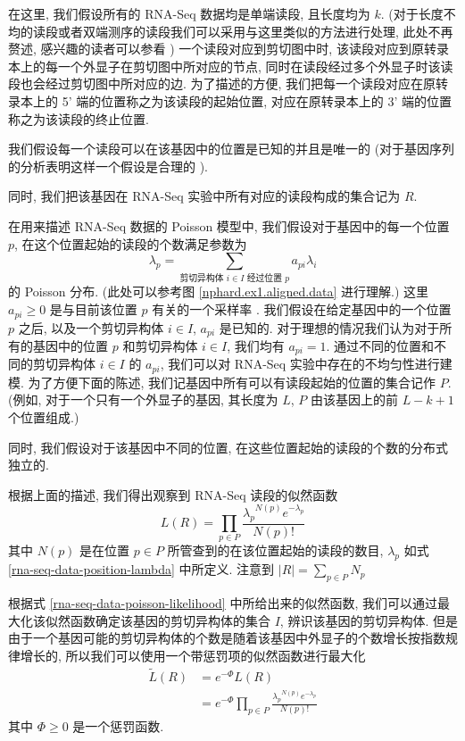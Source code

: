 在这里, 我们假设所有的 RNA-Seq 数据均是单端读段, 且长度均为 $k$. 
(对于长度不均的读段或者双端测序的读段我们可以采用与这里类似的方法进行处理, 
此处不再赘述, 感兴趣的读者可以参看 ) 
一个读段对应到剪切图中时, 该读段对应到原转录本上的每一个外显子在剪切图中所对应的节点, 
同时在读段经过多个外显子时该读段也会经过剪切图中所对应的边. 
为了描述的方便, 我们把每一个读段对应在原转录本上的 5' 端的位置称之为该读段的起始位置, 
对应在原转录本上的 3' 端的位置称之为该读段的终止位置. 

我们假设每一个读段可以在该基因中的位置是已知的并且是唯一的 
(对于基因序列的分析表明这样一个假设是合理的 \cite{peng2011t}). 

同时, 我们把该基因在 RNA-Seq 实验中所有对应的读段构成的集合记为 $R$. 

在用来描述 RNA-Seq 数据的 Poisson 模型中, 
我们假设对于基因中的每一个位置 $p$, 
在这个位置起始的读段的个数满足参数为 
\begin{equation}
\label{rna-seq-data-position-lambda}
\lambda_p = \sum_{\text{剪切异构体 $i \in I$ 经过位置 $p$}} a_{pi} \lambda_i
\end{equation}
的 Poisson 分布. (此处可以参考图 \ref{nphard.ex1.aligned.data} 进行理解.)
这里 $a_{pi} \geq 0$ 是与目前该位置 $p$ 有关的一个采样率 \cite{2011arXiv1106.3211S}. 
我们假设在给定基因中的一个位置 $p$ 之后, 以及一个剪切异构体 $i \in I$, 
$a_{pi}$ 是已知的. 
对于理想的情况我们认为对于所有的基因中的位置 $p$ 和剪切异构体 $i\in I$, 
我们均有 $a_{pi}=1$. 
通过不同的位置和不同的剪切异构体 $i\in I$ 的 $a_{pi}$, 
我们可以对 RNA-Seq 实验中存在的不均匀性进行建模. 
为了方便下面的陈述, 我们记基因中所有可以有读段起始的位置的集合记作 $P$. 
(例如, 对于一个只有一个外显子的基因, 其长度为 $L$, 
$P$ 由该基因上的前 $L-k+1$ 个位置组成.)

同时, 我们假设对于该基因中不同的位置, 
在这些位置起始的读段的个数的分布式独立的. 

根据上面的描述, 我们得出观察到 RNA-Seq 读段的似然函数
\begin{equation}
\label{rna-seq-data-poisson-likelihood}
L(R)= \prod_{p\in P} \frac{{\lambda_p}^{N(p)} e^{-\lambda_p}}{N(p)!}
\end{equation}
其中 $N(p)$ 是在位置 $p\in P$ 所管查到的在该位置起始的读段的数目, 
$\lambda_p$ 如式 \eqref{rna-seq-data-position-lambda} 中所定义. 
注意到 $|R|=\sum_{p\in P}N_p$

根据式 \eqref{rna-seq-data-poisson-likelihood} 中所给出来的似然函数, 
我们可以通过最大化该似然函数确定该基因的剪切异构体的集合 $I$, 
辨识该基因的剪切异构体. 
但是由于一个基因可能的剪切异构体的个数是随着该基因中外显子的个数增长按指数规律增长的, 
所以我们可以使用一个带惩罚项的似然函数进行最大化
\begin{align}
\tilde{L}(R) &= e^{-\Phi} L(R) \nonumber \\ 
\label{rna-seq-data-poisson-penalized-likelihood}
&= e^{-\Phi} \prod_{p\in P} \frac{{\lambda_p}^{N(p)} e^{-\lambda_p}}{N(p)!}
\end{align}
其中 $\Phi \geq 0$ 是一个惩罚函数. 

